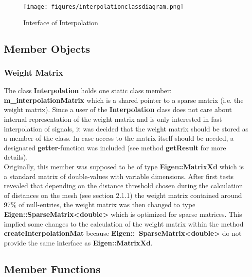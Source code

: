 \begin{figure}[h]
	\begin{center}
		\texttt{[image: figures/interpolationclassdiagram.png]}
		\caption{Interface of Interpolation}
	\end{center}
\end{figure}

\subsection{Member Objects}

\subsubsection{Weight Matrix}
The class \textbf{Interpolation} holds one static class member: \textbf{m\_interpolationMatrix} which is a shared pointer to a sparse matrix (i.e. the weight matrix). Since a user of the \textbf{Interpolation} class does not care about internal representation of the weight matrix and is only interested in fast interpolation of signals, it was decided that the weight matrix should be stored as a member of the class. In case access to the matrix itself should be needed, a designated \textbf{getter}-function was included (see method \textbf{getResult} for more details).\\
Originally, this member was supposed to be of type \textbf{Eigen::MatrixXd} which is a standard matrix of double-values with variable dimensions. After first tests revealed that depending on the distance threshold chosen during the calculation of distances on the mesh (see section 2.1.1) the weight matrix contained around 97\% of null-entries, the weight matrix was then changed to type \textbf{Eigen::SparseMatrix<double>} which is optimized for sparse matrices. This implied some changes to the calculation of the weight matrix within the method \textbf{createInterpolationMat} because \textbf{Eigen::\ SparseMatrix<double>} do not provide the same interface as \textbf{Eigen::MatrixXd}.

\subsection{Member Functions}

